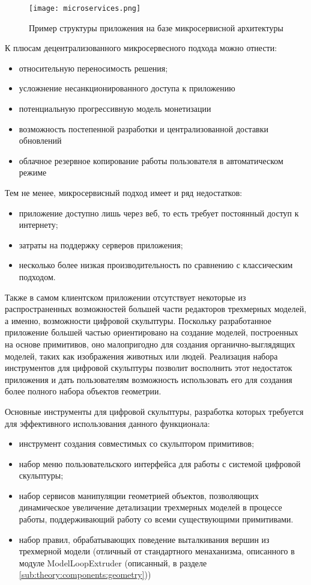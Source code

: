 \begin{figure}[ht]
\centering
  \texttt{[image: microservices.png]}
  \caption{Пример структуры приложения на базе микросервисной архитектуры}
  \label{figure:outro:microservices}
\end{figure}

К плюсам децентрализованного микросервесного подхода можно отнести:
\begin{itemize}
\item относительную переносимость решения;
\item усложнение несанкционированного доступа к приложению
\item потенциальную прогрессивную модель монетизации
\item возможность постепенной разработки и централизованной доставки обновлений
\item облачное резервное копирование работы пользователя в автоматическом режиме
\end{itemize}

Тем не менее, микросервисный подход имеет и ряд недостатков:

\begin{itemize}
\item приложение доступно лишь через веб, то есть требует постоянный доступ к интернету;
\item затраты на поддержку серверов приложения;
\item несколько более низкая производительность по сравнению с классическим подходом.
\end{itemize}

Также в самом клиентском приложении отсутствует некоторые из распространенных возможностей большей части редакторов трехмерных моделей, а именно, возможности цифровой скульптуры.
Поскольку разработанное приложение большей частью ориентировано на создание моделей, построенных на основе примитивов, оно малопригодно для создания органично-выглядящих моделей,
таких как изображения животных или людей. Реализация набора инструментов для цифровой скульптуры позволит восполнить этот недостаток приложения и дать пользователям возможность
использовать его для создания более полного набора объектов геометрии.

Основные инструменты для цифровой скульптуры, разработка которых требуется для эффективного использования данного функционала:
\begin{itemize}
\item инструмент создания совместимых со скульптором примитивов;
\item набор меню пользовательского интерфейса для работы с системой цифровой скульптуры;
\item набор сервисов манипуляции геометрией объектов, позволяющих динамическое увеличение детализации трехмерных моделей в процессе работы, поддерживающий работу со всеми
существующими примитивами.
\item набор правил, обрабатывающих поведение выталкивания вершин из трехмерной модели (отличный от стандартного менаханизма, описанного в модуле ModelLoopExtruder (описанный,
в разделе \ref{sub:theory:components:geometry}))
\end{itemize}

